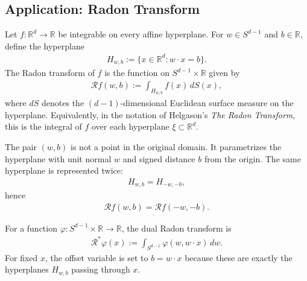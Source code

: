 \subsection{Application: Radon Transform}
\begin{definition}
Let $f:\mathbb{R}^d\rightarrow \mathbb{R}$ be integrable on every affine hyperplane. For $w\in S^{d-1}$ and $b\in \mathbb{R}$, define the hyperplane
\begin{align*}
	H_{w,b}:= \{x\in \mathbb{R}^d: w\cdot x=b\}.
\end{align*}
The Radon transform of $f$ is the function on $S^{d-1}\times \mathbb{R}$ given by
\begin{align*}
	\mathcal{R}f(w,b):= \int_{H_{w,b}} f(x)\,dS(x),
\end{align*}
where $dS$ denotes the $(d-1)$-dimensional Euclidean surface measure on the hyperplane. Equivalently, in the notation of Helgason's \emph{The Radon Transform}, this is the integral of $f$ over each hyperplane $\xi\subset \mathbb{R}^d$.
\end{definition}

\begin{remark}
The pair $(w,b)$ is not a point in the original domain. It parametrizes the hyperplane with unit normal $w$ and signed distance $b$ from the origin. The same hyperplane is represented twice:
\begin{align*}
	H_{w,b}=H_{-w,-b},
\end{align*}
hence
\begin{align*}
	\mathcal{R}f(w,b)=\mathcal{R}f(-w,-b).
\end{align*}
\end{remark}

\begin{definition}
For a function $\varphi:S^{d-1}\times \mathbb{R}\rightarrow \mathbb{R}$, the dual Radon transform is
\begin{align*}
	\mathcal{R}^*\varphi(x):= \int_{S^{d-1}}\varphi(w,w\cdot x)\,dw.
\end{align*}
For fixed $x$, the offset variable is set to $b=w\cdot x$ because these are exactly the hyperplanes $H_{w,b}$ passing through $x$.
\end{definition}

